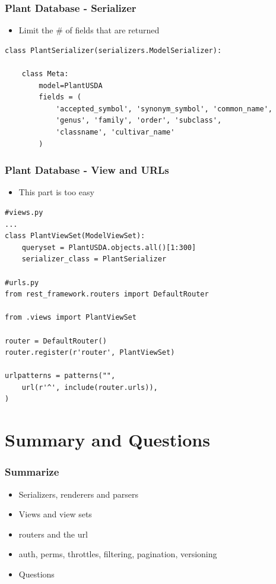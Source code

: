 \documentclass{beamer}
\begin{document}
\begin{frame}[fragile]

  \frametitle{Plant Database - Serializer}
  
  \begin{itemize}
      \item Limit the \# of fields that are returned
  \end{itemize}
  
  \begin{lstlisting}
class PlantSerializer(serializers.ModelSerializer):

    class Meta:
        model=PlantUSDA
        fields = (
            'accepted_symbol', 'synonym_symbol', 'common_name',
            'genus', 'family', 'order', 'subclass',
            'classname', 'cultivar_name'
        )
  \end{lstlisting}
  
\end{frame}

\begin{frame}[fragile]

  \frametitle{Plant Database - View and URLs}
  
  \begin{itemize}
      \item This part is too easy
  \end{itemize}
  
  \begin{lstlisting}
#views.py
...
class PlantViewSet(ModelViewSet):
    queryset = PlantUSDA.objects.all()[1:300]
    serializer_class = PlantSerializer
    
#urls.py
from rest_framework.routers import DefaultRouter

from .views import PlantViewSet

router = DefaultRouter()
router.register(r'router', PlantViewSet)

urlpatterns = patterns("",
    url(r'^', include(router.urls)),
)    
  \end{lstlisting}
  
\end{frame}

\section{Summary and Questions}
\begin{frame}[fragile]

  \frametitle{Summarize}
  
  \begin{itemize}
      \item<1-> Serializers, renderers and parsers
      \item<2-> Views and view sets
      \item<3-> routers and the url
      \item<4-> auth, perms, throttles, filtering, pagination, versioning
      \item<5-> Questions
  \end{itemize}
  
\end{frame}
\end{document}
